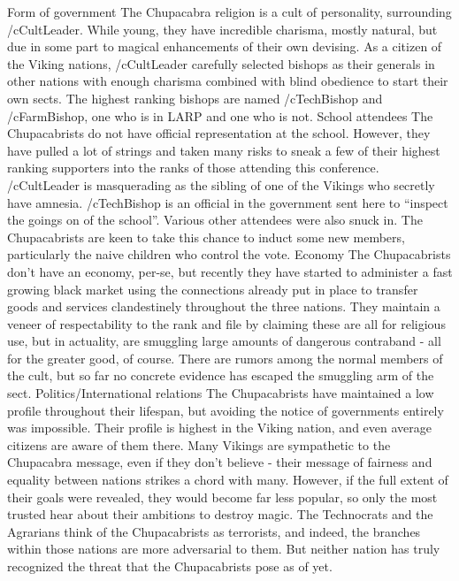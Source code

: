 \documentclass[blue]{GL2020}
\begin{document}
\name{\bAgrarian{}}

Form of government
The Chupacabra religion is a cult of personality, surrounding /cCultLeader. While young, they have incredible charisma, mostly natural, but due in some part to magical enhancements of their own devising. As a citizen of the Viking nations, /cCultLeader carefully selected bishops as their generals in other nations with enough charisma combined with blind obedience to start their own sects. The highest ranking bishops are named /cTechBishop and /cFarmBishop, one who is in LARP and one who is not.
School attendees
The Chupacabrists do not have official representation at the school. However, they have pulled a lot of strings and taken many risks to sneak a few of their highest ranking supporters into the ranks of those attending this conference. /cCultLeader is masquerading as the sibling of one of the Vikings who secretly have amnesia. /cTechBishop is an official in the government sent here to “inspect the goings on of the school”. Various other attendees were also snuck in.
The Chupacabrists are keen to take this chance to induct some new members, particularly the naive children who control the vote.
Economy
The Chupacabrists don’t have an economy, per-se, but recently they have started to administer a fast growing black market using the connections already put in place to transfer goods and services clandestinely throughout the three nations. They maintain a veneer of respectability to the rank and file by claiming these are all for religious use, but in actuality, are smuggling large amounts of dangerous contraband - all for the greater good, of course. There are rumors among the normal members of the cult, but so far no concrete evidence has escaped the smuggling arm of the sect.
Politics/International relations
The Chupacabrists have maintained a low profile throughout their lifespan, but avoiding the notice of governments entirely was impossible. Their profile is highest in the Viking nation, and even average citizens are aware of them there. Many Vikings are sympathetic to the Chupacabra message, even if they don’t believe - their message of fairness and equality between nations strikes a chord with many. However, if the full extent of their goals were revealed, they would become far less popular, so only the most trusted hear about their ambitions to destroy magic.
The Technocrats and the Agrarians think of the Chupacabrists as terrorists, and indeed, the branches within those nations are more adversarial to them. But neither nation has truly recognized the threat that the Chupacabrists pose as of yet.
\end{document}
